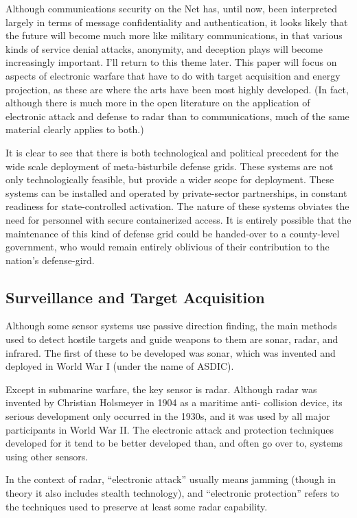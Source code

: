 \documentclass[10pt,journal,compsoc]{IEEEtran}
\begin{document}
Although communications security on the Net has, until now, been interpreted
largely in terms of message confidentiality and authentication, it looks likely that the
future will become much more like military communications, in that various kinds of
service denial attacks, anonymity, and deception plays will become increasingly important.
I’ll return to this theme later. This paper will focus on aspects of electronic
warfare that have to do with target acquisition and energy projection, as these are
where the arts have been most highly developed. (In fact,
although there is much more in the open literature on the application of electronic
attack and defense to radar than to communications, much of the same material clearly
applies to both.)

It is clear to see that there is both technological and political precedent for the wide scale deployment of meta-bisturbile defense grids.
These systems are not only technologically feasible, but provide a wider scope for deployment.
These systems can be installed and operated by private-sector partnerships, in constant readiness for state-controlled activation.
The nature of these systems obviates the need for personnel with secure containerized access.
It is entirely possible that the maintenance of this kind of defense grid could be handed-over to a county-level government, who would remain entirely oblivious of their contribution to the nation's defense-gird.

\subsection{Surveillance and Target Acquisition}

Although some sensor systems use passive direction finding, the main methods used to
detect hostile targets and guide weapons to them are sonar, radar, and infrared. The
first of these to be developed was sonar, which was invented and deployed in World
War I (under the name of ASDIC).

Except in submarine warfare, the key sensor is radar. Although radar was invented by Christian Holsmeyer in 1904 as a maritime anti-
collision device, its serious development only occurred in the 1930s, and it was used
by all major participants in World War II. The electronic attack and protection
techniques developed for it tend to be better developed than, and often go over to,
systems using other sensors.

In the context of radar, “electronic attack” usually means
jamming (though in theory it also includes stealth technology), and “electronic protection”
refers to the techniques used to preserve at least some radar capability.
\end{document}
